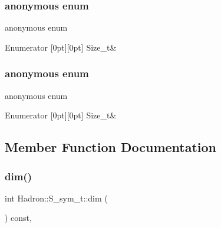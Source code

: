 \subsubsection{\texorpdfstring{anonymous enum}{anonymous enum}}
{\footnotesize\ttfamily anonymous enum}

\begin{DoxyEnumFields}{Enumerator}
[0pt][0pt]{}\mbox{\label{structHadron_1_1S__sym__t_aeda306455b317dba7734293ab74c8390a1425783a12f6062d3bf3449dbd46dc20}} 
Size\+\_\+t&\\
\hline

\end{DoxyEnumFields}
\mbox{\label{structHadron_1_1S__sym__t_aeda306455b317dba7734293ab74c8390}} 
\subsubsection{\texorpdfstring{anonymous enum}{anonymous enum}}
{\footnotesize\ttfamily anonymous enum}

\begin{DoxyEnumFields}{Enumerator}
[0pt][0pt]{}\mbox{\label{structHadron_1_1S__sym__t_aeda306455b317dba7734293ab74c8390a1425783a12f6062d3bf3449dbd46dc20}} 
Size\+\_\+t&\\
\hline

\end{DoxyEnumFields}


\subsection{Member Function Documentation}
\mbox{\label{structHadron_1_1S__sym__t_ae8b1558dc91f46f5d78de03f1e587dc0}} 
\subsubsection{\texorpdfstring{dim()}{dim()}\hspace{0.1cm}{\footnotesize\ttfamily [1/3]}}
{\footnotesize\ttfamily int Hadron\+::\+S\+\_\+sym\+\_\+t\+::dim (\begin{DoxyParamCaption}{ }\end{DoxyParamCaption}) const\hspace{0.3cm}{\ttfamily [inline]}, {\ttfamily [virtual]}}



